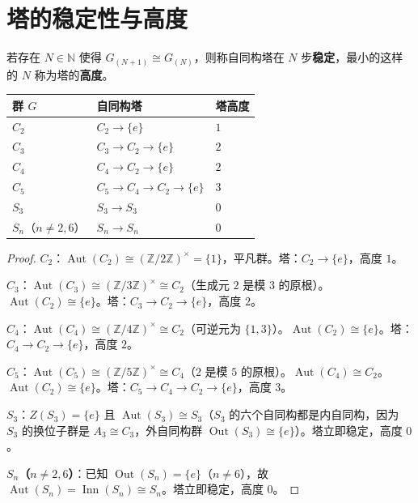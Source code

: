 \section{塔的稳定性与高度}

\begin{definition}[塔的稳定与高度]\label{def:tower_stability}
若存在 $N\in\mathbb{N}$ 使得 $G_{(N+1)} \cong G_{(N)}$，则称自同构塔在 $N$ 步\textbf{稳定}，最小的这样的 $N$ 称为塔的\textbf{高度}。
\end{definition}

\begin{proposition}[典型群的自同构塔高度]\label{prop:tower_heights}
\begin{center}
\begin{tabular}{>{\centering\arraybackslash}p{3cm}>{\centering\arraybackslash}p{5cm}>{\centering\arraybackslash}p{3cm}}
\toprule
群 $G$ & 自同构塔 & 塔高度 \\
\midrule
$C_2$ & $C_2 \to \{e\}$ & $1$ \\
$C_3$ & $C_3 \to C_2 \to \{e\}$ & $2$ \\
$C_4$ & $C_4 \to C_2 \to \{e\}$ & $2$ \\
$C_5$ & $C_5 \to C_4 \to C_2 \to \{e\}$ & $3$ \\
$S_3$ & $S_3 \to S_3$ & $0$ \\
$S_n$（$n\neq 2,6$） & $S_n \to S_n$ & $0$ \\
\bottomrule
\end{tabular}
\end{center}
\end{proposition}

\begin{proof}
\textbf{$C_2$}：$\operatorname{Aut}(C_2) \cong (\mathbb{Z}/2\mathbb{Z})^\times = \{1\}$，平凡群。塔：$C_2 \to \{e\}$，高度 $1$。

\textbf{$C_3$}：$\operatorname{Aut}(C_3) \cong (\mathbb{Z}/3\mathbb{Z})^\times \cong C_2$（生成元 $2$ 是模 $3$ 的原根）。$\operatorname{Aut}(C_2) \cong \{e\}$。塔：$C_3 \to C_2 \to \{e\}$，高度 $2$。

\textbf{$C_4$}：$\operatorname{Aut}(C_4) \cong (\mathbb{Z}/4\mathbb{Z})^\times \cong C_2$（可逆元为 $\{1,3\}$）。$\operatorname{Aut}(C_2) \cong \{e\}$。塔：$C_4 \to C_2 \to \{e\}$，高度 $2$。

\textbf{$C_5$}：$\operatorname{Aut}(C_5) \cong (\mathbb{Z}/5\mathbb{Z})^\times \cong C_4$（$2$ 是模 $5$ 的原根）。$\operatorname{Aut}(C_4) \cong C_2$。$\operatorname{Aut}(C_2) \cong \{e\}$。塔：$C_5 \to C_4 \to C_2 \to \{e\}$，高度 $3$。

\textbf{$S_3$}：$Z(S_3) = \{e\}$ 且 $\operatorname{Aut}(S_3) \cong S_3$（$S_3$ 的六个自同构都是内自同构，因为 $S_3$ 的换位子群是 $A_3 \cong C_3$，外自同构群 $\operatorname{Out}(S_3) \cong \{e\}$）。塔立即稳定，高度 $0$。

\textbf{$S_n$（$n \neq 2,6$）}：已知 $\operatorname{Out}(S_n) = \{e\}$（$n \neq 6$），故 $\operatorname{Aut}(S_n) = \operatorname{Inn}(S_n) \cong S_n$。塔立即稳定，高度 $0$。
\end{proof}

